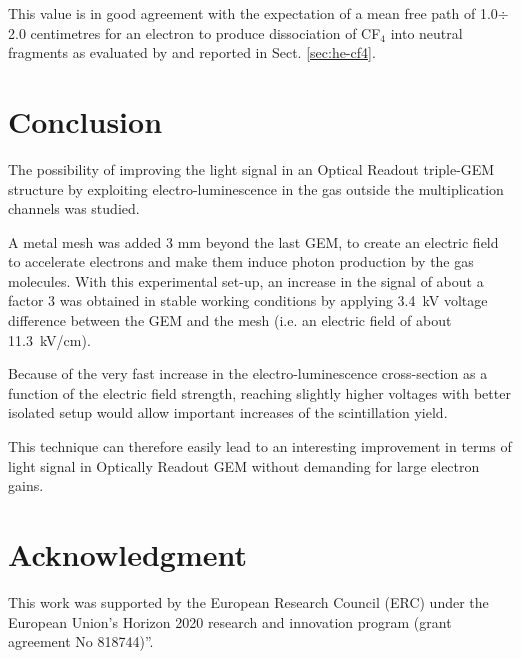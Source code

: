 \documentclass[a4paper,11pt]{article}
\begin{document}
This value is in good agreement with the expectation of a mean free path of 1.0$\div$2.0 centimetres for an electron to produce dissociation of CF$_4$ into neutral fragments as evaluated by \cite{bib:Fraga} and reported in Sect. \ref{sec:he-cf4}.

\section{Conclusion}

The possibility of improving the light signal in an Optical Readout triple-GEM structure by exploiting electro-luminescence in the gas outside the multiplication channels was studied.

A metal mesh was added 3 mm beyond the last GEM, to create an electric field to accelerate electrons and make them induce photon production by the gas molecules.
With this experimental set-up, an increase in the signal of about a factor 3 was obtained in stable working conditions by applying 3.4~kV  voltage difference between the GEM and the mesh (i.e. an electric field of about 11.3~kV/cm).

Because of the very fast increase in the electro-luminescence cross-section as a function of the electric field strength, 
reaching slightly higher voltages with better isolated setup would allow important increases of the scintillation yield. 

This technique can therefore easily lead to an interesting improvement in terms of light 
signal in Optically Readout GEM without demanding for large electron gains.

\section*{Acknowledgment}
This work was supported by the European Research Council (ERC) under the European Union’s Horizon 2020 research and innovation program (grant agreement No 818744)”.



{}

\end{document}
